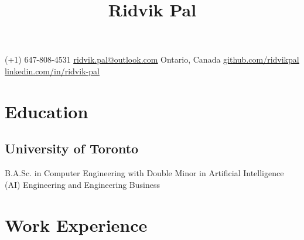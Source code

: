 \documentclass[10pt, a4paper]{article}
\begin{document}
\title{\vspace{-1.5cm}\textbf{Ridvik Pal}\vspace{-1.5cm}}
\date{}
\author{}
\maketitle
\begin{center}
    (+1) 647-808-4531
    \hfill
    \href{mailto:ridvik.pal@outlook.com}{\underline{ridvik.pal@outlook.com}}
    \hfill
    Ontario, Canada
    \hfill
    \href{https://github.com/ridvikpal}{\underline{github.com/ridvikpal}}
    \hfill
    \href{https://www.linkedin.com/in/ridvik-pal}{\underline{linkedin.com/in/ridvik-pal}}
\end{center}\vspace{-10pt}

\section*{Education}
\subsection*{University of Toronto\hfill {}}
\raggedright
B.A.Sc. in Computer Engineering with Double Minor in Artificial Intelligence (AI) Engineering and Engineering Business


\section*{Work Experience}

\end{document}
